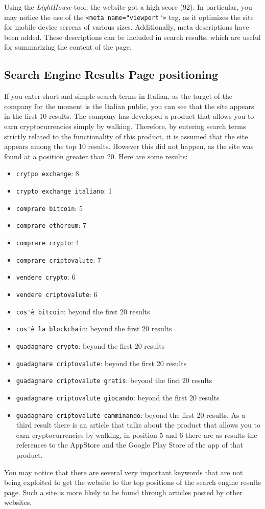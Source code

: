 Using the \textit{LightHouse} tool, the website got a high score (92). In 
particular, you may notice the use of the \verb|<meta name="viewport">| 
tag, as it optimizes the site for mobile device screens of various sizes. 
Additionally, meta descriptions have been added. These descriptions can be 
included in search results, which are useful for summarizing the content of 
the page.

\subsection{Search Engine Results Page positioning}

If you enter short and simple search terms in Italian, as the target of 
the company for the moment is the Italian public, you can see that the 
site appears in the first 10 results. The company has developed a product 
that allows you to earn cryptocurrencies simply by walking. Therefore, by 
entering search terms strictly related to the functionality of this 
product, it is assumed that the site appears among the top 10 results. 
However this did not happen, as the site was found at a position greater 
than 20. Here are some results:
\begin{itemize}
  \item \verb|crytpo exchange|: 8
  \item \verb|crypto exchange italiano|: 1
  \item \verb|comprare bitcoin|: 5
  \item \verb|comprare ethereum|: 7
  \item \verb|comprare crypto|: 4
  \item \verb|comprare criptovalute|: 7
  \item \verb|vendere crypto|: 6
  \item \verb|vendere criptovalute|: 6
  \item \verb|cos'è bitcoin|: beyond the first 20 results
  \item \verb|cos'è la blockchain|: beyond the first 20 results
  \item \verb|guadagnare crypto|: beyond the first 20 results
  \item \verb|guadagnare criptovalute|: beyond the first 20 results
  \item \verb|guadagnare criptovalute gratis|: beyond the first 20 results
  \item \verb|guadagnare criptovalute giocando|: beyond the first 20 results
  \item \verb|guadagnare criptovalute camminando|: beyond the first 20 
  results. As a third result there is an article that talks about the 
  product that allows you to earn cryptocurrencies by walking, in position 
  5 and 6 there are as results the references to the AppStore and the 
  Google Play Store of the app of that product.
\end{itemize}

You may notice that there are several very important keywords that are not 
being exploited to get the website to the top positions of the search 
engine results page. Such a site is more likely to be found through 
articles posted by other websites.